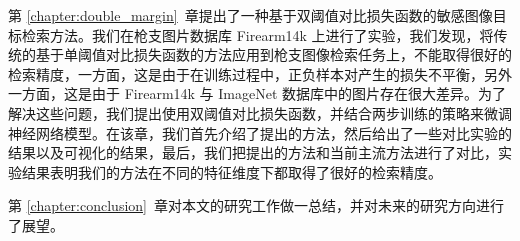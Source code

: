 第 \ref{chapter:double_margin}~章提出了一种基于双阈值对比损失函数的敏感图像目标检索方法。我们在枪支图片数据库 Firearm14k 上进行了实验，我们发现，将传统的基于单阈值对比损失函数的方法应用到枪支图像检索任务上，不能取得很好的检索精度，一方面，这是由于在训练过程中，正负样本对产生的损失不平衡，另外一方面，这是由于 Firearm14k 与 ImageNet 数据库中的图片存在很大差异。为了解决这些问题，我们提出使用双阈值对比损失函数，并结合两步训练的策略来微调神经网络模型。在该章，我们首先介绍了提出的方法，然后给出了一些对比实验的结果以及可视化的结果，最后，我们把提出的方法和当前主流方法进行了对比，实验结果表明我们的方法在不同的特征维度下都取得了很好的检索精度。

第 \ref{chapter:conclusion}~章对本文的研究工作做一总结，并对未来的研究方向进行了展望。
